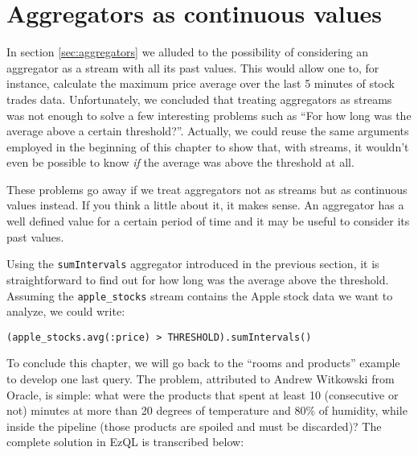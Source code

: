 \documentclass{report}
\begin{document}
\section{Aggregators as continuous values}
\label{sec:aggregators-continuous-values}

In section \ref{sec:aggregators} we alluded to the possibility of
considering an aggregator as a stream with all its past values. This
would allow one to, for instance, calculate the maximum price average
over the last 5 minutes of stock trades data. Unfortunately, we
concluded that treating aggregators as streams was not enough to solve
a few interesting problems such as ``For how long was the average
above a certain threshold?''. Actually, we could reuse the same
arguments employed in the beginning of this chapter to show that, with
streams, it wouldn't even be possible to know \emph{if} the average
was above the threshold at all.

These problems go away if we treat aggregators not as streams but as
continuous values instead. If you think a little about it, it makes
sense. An aggregator has a well defined value for a certain period of
time and it may be useful to consider its past values.

Using the \verb=sumIntervals= aggregator introduced in the previous
section, it is straightforward to find out for how long was the
average above the threshold. Assuming the \verb=apple_stocks= stream
contains the Apple stock data we want to analyze, we could write:

\begin{verbatim}
(apple_stocks.avg(:price) > THRESHOLD).sumIntervals()
\end{verbatim}

To conclude this chapter, we will go back to the ``rooms and
products'' example to develop one last query. The problem, attributed
to Andrew Witkowski from Oracle, is simple: what were the products
that spent at least 10 (consecutive or not) minutes at more than 20
degrees of temperature and 80\% of humidity, while inside the pipeline
(those products are spoiled and must be discarded)? The complete
solution in EzQL is transcribed below:
\end{document}
